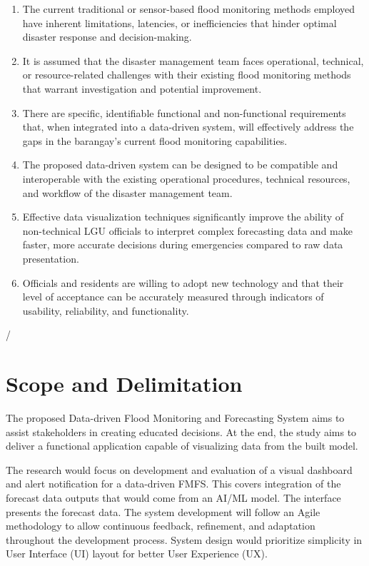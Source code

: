 \documentclass{research}
\begin{document}
\begin{enumerate}
    \item The current traditional or sensor-based flood monitoring methods employed have inherent limitations, latencies, or inefficiencies that hinder optimal disaster response and decision-making.
    \item It is assumed that the disaster management team faces operational, technical, or resource-related challenges with their existing flood monitoring methods that warrant investigation and potential improvement.
    \item There are specific, identifiable functional and non-functional requirements that, when integrated into a data-driven system, will effectively address the gaps in the barangay's current flood monitoring capabilities.
    \item The proposed data-driven system can be designed to be compatible and interoperable with the existing operational procedures, technical resources, and workflow of the disaster management team.
    \item Effective data visualization techniques significantly improve the ability of non-technical LGU officials to interpret complex forecasting data and make faster, more accurate decisions during emergencies compared to raw data presentation.
    \item Officials and residents are willing to adopt new technology and that their level of acceptance can be accurately measured through indicators of usability, reliability, and functionality.
\end{enumerate}
/
\section{Scope and Delimitation}

The proposed Data-driven Flood Monitoring and Forecasting System aims to assist stakeholders in creating educated decisions. At the end, the study aims to deliver a functional application capable of visualizing data from the built model.

The research would focus on development and evaluation of a visual dashboard and alert notification for a data-driven FMFS. This covers integration of the forecast data outputs that would come from an AI/ML model. The interface presents the forecast data. The system development will follow an Agile methodology to allow continuous feedback, refinement, and adaptation throughout the development process. System design would prioritize simplicity in User Interface (UI) layout for better User Experience (UX).
\end{document}
